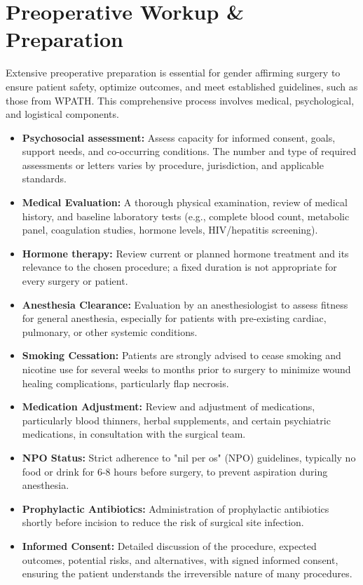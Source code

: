 \section*{Preoperative Workup \& Preparation}
Extensive preoperative preparation is essential for gender affirming surgery to ensure patient safety, optimize outcomes, and meet established guidelines, such as those from WPATH. This comprehensive process involves medical, psychological, and logistical components.

\begin{itemize}
  \item \textbf{Psychosocial assessment:} Assess capacity for informed consent, goals, support needs, and co-occurring conditions. The number and type of required assessments or letters varies by procedure, jurisdiction, and applicable standards.
  \item \textbf{Medical Evaluation:} A thorough physical examination, review of medical history, and baseline laboratory tests (e.g., complete blood count, metabolic panel, coagulation studies, hormone levels, HIV/hepatitis screening).
  \item \textbf{Hormone therapy:} Review current or planned hormone treatment and its relevance to the chosen procedure; a fixed duration is not appropriate for every surgery or patient.
  \item \textbf{Anesthesia Clearance:} Evaluation by an anesthesiologist to assess fitness for general anesthesia, especially for patients with pre-existing cardiac, pulmonary, or other systemic conditions.
  \item \textbf{Smoking Cessation:} Patients are strongly advised to cease smoking and nicotine use for several weeks to months prior to surgery to minimize wound healing complications, particularly flap necrosis.
  \item \textbf{Medication Adjustment:} Review and adjustment of medications, particularly blood thinners, herbal supplements, and certain psychiatric medications, in consultation with the surgical team.
  \item \textbf{NPO Status:} Strict adherence to "nil per os" (NPO) guidelines, typically no food or drink for 6-8 hours before surgery, to prevent aspiration during anesthesia.
  \item \textbf{Prophylactic Antibiotics:} Administration of prophylactic antibiotics shortly before incision to reduce the risk of surgical site infection.
  \item \textbf{Informed Consent:} Detailed discussion of the procedure, expected outcomes, potential risks, and alternatives, with signed informed consent, ensuring the patient understands the irreversible nature of many procedures.
\end{itemize}

